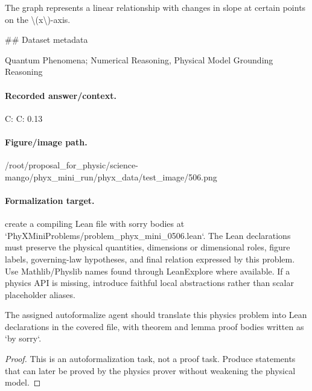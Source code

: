 The graph represents a linear relationship with changes in slope at certain points on the \textbackslash{}(x\textbackslash{})-axis.

\#\# Dataset metadata

Quantum Phenomena; Numerical Reasoning, Physical Model Grounding Reasoning

\paragraph{Recorded answer/context.}
C: C: 0.13

\paragraph{Figure/image path.}
/root/proposal\_for\_physic/science-mango/phyx\_mini\_run/phyx\_data/test\_image/506.png

\paragraph{Formalization target.}
create a compiling Lean file with sorry bodies at `PhyXMiniProblems/problem\_phyx\_mini\_0506.lean`. The Lean declarations must preserve the physical quantities, dimensions or dimensional roles, figure labels, governing-law hypotheses, and final relation expressed by this problem.
Use Mathlib/Physlib names found through LeanExplore where available. If a physics API is missing, introduce faithful local abstractions rather than scalar placeholder aliases.

\begin{theorem}
\label{thm:physics:phyx_mini_0506:target}
The assigned autoformalize agent should translate this physics problem into Lean declarations in the covered file, with theorem and lemma proof bodies written as `by sorry`.
\end{theorem}
\begin{proof}
This is an autoformalization task, not a proof task. Produce statements that can later be proved by the physics prover without weakening the physical model.
\end{proof}

